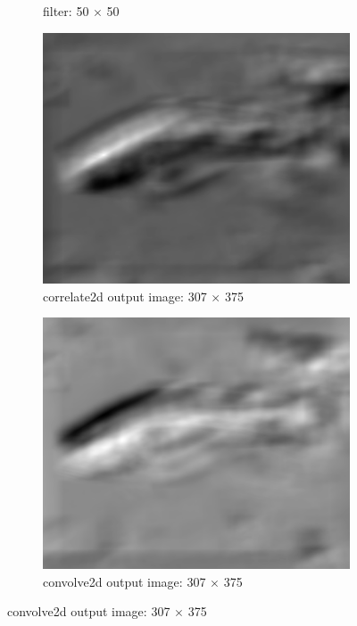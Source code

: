 \begin{enumerate}[(a)]
\begin{figure}[htbp]
\begin{subfigure}[htbp]{0.24\textwidth}
        \caption{filter: 50 $\times$ 50}
        \label{filter_fish}
    \end{subfigure}
    \hfill
    \begin{subfigure}[htbp]{0.24\textwidth}
        \centering
        \includegraphics[width=\textwidth]{correlate2d_fish.png}
        \caption{correlate2d output image: 307 $\times$ 375}
        \label{correlate2d_fish}
    \end{subfigure}
    \hfill 
    \begin{subfigure}[htbp]{0.24\textwidth}
        \centering
        \includegraphics[width=\textwidth]{convolve2d_fish.png}
        \caption{convolve2d output image: 307 $\times$ 375}
        \label{convolve2d_fish}
    \end{subfigure}
\end{figure}
\end{enumerate}

